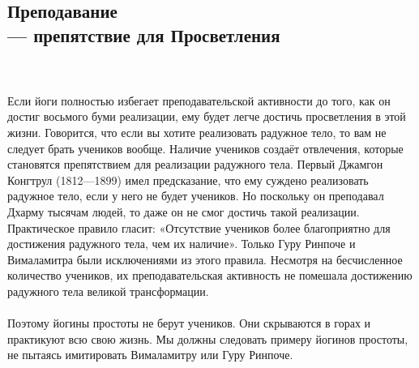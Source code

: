 \subsection{Преподавание \\— препятствие для Просветления}
\\ \\ Если йоги полностью избегает преподавательской активности до того, как он достиг восьмого буми реализации, ему будет легче достичь просветления в этой жизни. Говорится, что если вы хотите реализовать радужное тело, то вам не следует брать учеников вообще. Наличие учеников создаёт отвлечения, которые становятся препятствием для реализации радужного тела. Первый Джамгон Конгтрул (1812—1899) имел предсказание, что ему суждено реализовать радужное тело, если у него не будет учеников. Но поскольку он преподавал Дхарму тысячам людей, то даже он не смог достичь такой реализации. Практическое правило гласит: «Отсутствие учеников более благоприятно для достижения радужного тела, чем их наличие». Только Гуру Ринпоче и Вималамитра были исключениями из этого правила. Несмотря на бесчисленное количество учеников, их преподавательская активность не помешала достижению радужного тела великой трансформации.
\\ \\ Поэтому йогины простоты не берут учеников. Они скрываются в горах и практикуют всю свою жизнь. Мы должны следовать примеру йогинов простоты, не пытаясь имитировать Вималамитру или Гуру Ринпоче.

